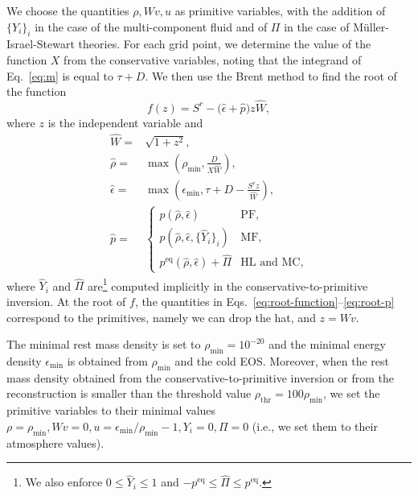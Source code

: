 \documentclass[aps,prd,twocolumn,a4paper,floatfix,nofootbib,superscriptaddress,nofootinbib]{revtex4}
\newcommand{\req}{\mathrm{eq}}
\begin{document}
We choose the quantities $\rho,Wv,u$ as primitive variables, with the addition of
$\{Y_i\}_i$ in the case of the multi-component fluid and of $\Pi$ in the case of M\"uller-Israel-Stewart theories.
For each grid point, we determine the value of the function $X$ from the conservative
variables, noting that the integrand of Eq.~\eqref{eq:m} is equal to $\tau+D$.
We then use the Brent method to find the root of the function
%
\begin{equation}
\label{eq:root-function}
f(z)= S^r - \big(\hat\epsilon + \hat p\big)z\hat W,
\end{equation}
%
where $z$ is the independent variable and
%
\begin{align}
\hat W={}& \sqrt{1 + z^2},\\
\hat\rho={}& \max\left(\rho_\mathrm{min},\frac{D}{X\hat W}\right),\\
\hat\epsilon={}& \max\left(\epsilon_\mathrm{min}, \tau + D - \frac{S^rz}{\hat W}\right),\\
\label{eq:root-p}
\hat p={}&\begin{cases}
p(\hat\rho,\hat \epsilon) & \mbox{PF},\\
p(\hat\rho,\hat \epsilon, \{\hat Y_i\}_i) & \mbox{MF},\\
p^\req(\hat\rho,\hat \epsilon) + \hat \Pi & \mbox{HL and MC},
\end{cases}
\end{align}
%
where $\hat Y_i$ and $\hat \Pi$ are\footnote{We also enforce $0\le\hat Y_i\le1$ and
$-p^\req\le\hat \Pi\le p^\req$.} computed implicitly in the conservative-to-primitive
inversion.
At the root of $f$, the quantities in
Eqs.~\eqref{eq:root-function}--\eqref{eq:root-p} correspond to the primitives,
namely we can drop the hat, and $z=Wv$.

The minimal rest mass density is set to $\rho_\mathrm{min}=10^{-20}$ and the
minimal energy density $\epsilon_\mathrm{min}$ is obtained from
$\rho_\mathrm{min}$ and the cold EOS.
Moreover, when the rest mass density obtained from the conservative-to-primitive
inversion or from the reconstruction is smaller than the threshold value
$\rho_\mathrm{thr}=100\rho_\mathrm{min}$, we set the primitive variables to their
minimal values $\rho=\rho_\mathrm{min},Wv=0,u=\epsilon_\mathrm{min}/\rho_\mathrm{min}-1,Y_i=0,\Pi=0$
(i.e., we set them to their atmosphere values).
\end{document}
